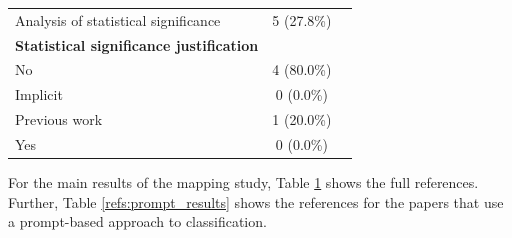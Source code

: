 \documentclass[a4paper]{article}
\begin{document}
\begin{appendices}
\begin{table}[ht]
\begin{tabularx}{\textwidth}{|l|c|X|}
		Analysis of statistical significance & 5 (27.8\%) & \cite{10.1145/3597503.3623345,10648982,10659742,10746847,10704582}\\
		\textbf{Statistical significance justification}&& \\
		\hspace{3mm} No & 4 (80.0\%) & \cite{10648982,10659742,10746847,10704582} \\
		\hspace{3mm} Implicit & 0 (0.0\%) &  \\
		\hspace{3mm} Previous work & 1 (20.0\%) & \cite{10.1145/3597503.3623345}\\
		\hspace{3mm} Yes & 0 (0.0\%) &   \\
		\hline
	\end{tabularx}
	\label{refs:mapping_metrics}
\end{table}

For the main results of the mapping study, Table \ref{refs:mapping_metrics} shows the full references. Further, Table \ref{refs:prompt_results} shows the references for the papers that use a prompt-based approach to classification. 


\end{appendices}
\end{document}
